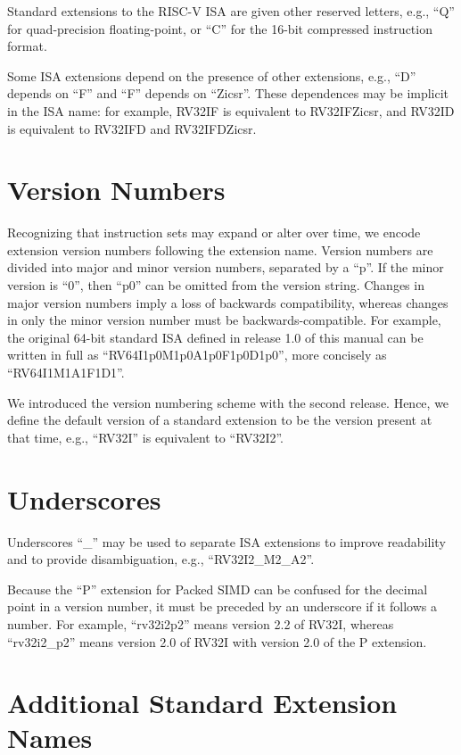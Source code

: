 Standard extensions to the RISC-V ISA are given other reserved
letters, e.g., ``Q'' for quad-precision floating-point, or
``C'' for the 16-bit compressed instruction format.

Some ISA extensions depend on the presence of other extensions, e.g., ``D''
depends on ``F'' and ``F'' depends on ``Zicsr''.  These dependences may be
implicit in the ISA name: for example, RV32IF is equivalent to RV32IFZicsr,
and RV32ID is equivalent to RV32IFD and RV32IFDZicsr.

\section{Version Numbers}
Recognizing that instruction sets may expand or alter over time, we
encode extension version numbers following the extension name.  Version
numbers are divided into major and minor version numbers, separated by
a ``p''.  If the minor version is ``0'', then ``p0'' can be omitted
from the version string.  Changes in major version numbers imply a
loss of backwards compatibility, whereas changes in only the minor
version number must be backwards-compatible.  For example, the
original 64-bit standard ISA defined in release 1.0 of this manual can
be written in full as ``RV64I1p0M1p0A1p0F1p0D1p0'', more concisely as
``RV64I1M1A1F1D1''.

We introduced the version numbering scheme with the second release.  Hence, we
define the default version of a standard extension to be the version present at that
time, e.g., ``RV32I'' is equivalent to ``RV32I2''.

\section{Underscores}

Underscores ``\_'' may be used to separate ISA extensions to
improve readability and to provide disambiguation, e.g., ``RV32I2\_M2\_A2''.

Because the ``P'' extension for Packed SIMD can be confused for the decimal
point in a version number, it must be preceded by an underscore if it follows
a number.  For example, ``rv32i2p2'' means version 2.2 of RV32I, whereas
``rv32i2\_p2'' means version 2.0 of RV32I with version 2.0 of the P extension.

\section{Additional Standard Extension Names}

